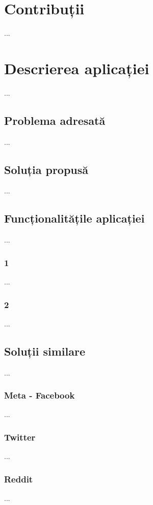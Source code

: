 \documentclass{article}
\begin{document}
\newpage

\section{Contribuții}
\label{Contribuții}
...
\newpage
\section{Descrierea aplicației}
\label{Descrierea aplicației}
...
    \subsection{Problema adresată}
    \label{Problema adresată}
    ...
    \subsection{Soluția propusă}
    \label{Soluția propusă}
    ...
    \subsection{Funcționalitățile aplicației}
    \label{Funcționalitățile aplicației}
    ...
        \subsubsection{1}
        \label{Funcționalitățile aplicației 1}
        ...
        \subsubsection{2}
        \label{Funcționalitățile aplicației 2}
        ...
    \subsection{Soluții similare}
        \label{Soluții similare}
        ...
        \subsubsection{Meta - Facebook}
        \label{Soluții similare Meta - Facebook}
        ...
        \subsubsection{Twitter}
        \label{Soluții similare Twitter}
        ...
        \subsubsection{Reddit}
        \label{Soluții similare Reddit}
        ...
\end{document}
